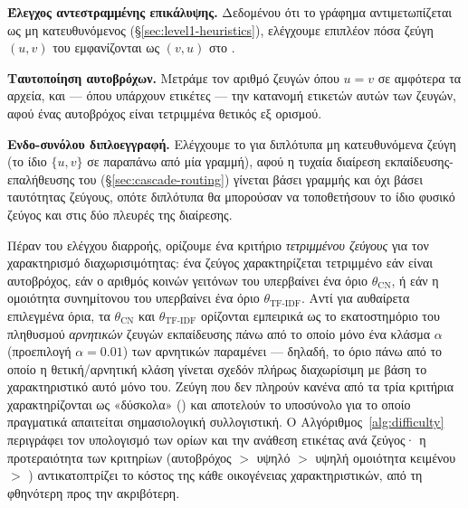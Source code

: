 \textbf{Έλεγχος αντεστραμμένης επικάλυψης.} Δεδομένου ότι το γράφημα αντιμετωπίζεται
ως μη κατευθυνόμενος (\S\ref{sec:level1-heuristics}), ελέγχουμε επιπλέον πόσα ζεύγη
$(u, v)$ του \texttt{} εμφανίζονται ως $(v, u)$ στο
\texttt{}.

\textbf{Ταυτοποίηση αυτοβρόχων.} Μετράμε τον αριθμό ζευγών όπου $u = v$ σε αμφότερα
τα αρχεία, και --- όπου υπάρχουν ετικέτες --- την κατανομή ετικετών αυτών των
ζευγών, αφού ένας αυτοβρόχος είναι τετριμμένα θετικός εξ ορισμού.

\textbf{Ενδο-συνόλου διπλοεγγραφή.} Ελέγχουμε το \texttt{} για
διπλότυπα μη κατευθυνόμενα ζεύγη (το ίδιο $\{u, v\}$ σε παραπάνω από μία γραμμή),
αφού η τυχαία διαίρεση εκπαίδευσης-επαλήθευσης του 
(\S\ref{sec:cascade-routing}) γίνεται βάσει γραμμής και όχι βάσει ταυτότητας
ζεύγους, οπότε διπλότυπα θα μπορούσαν να τοποθετήσουν το ίδιο φυσικό ζεύγος και
στις δύο πλευρές της διαίρεσης.

Πέραν του ελέγχου διαρροής, ορίζουμε ένα κριτήριο \textit{τετριμμένου ζεύγους} για
τον χαρακτηρισμό διαχωρισιμότητας: ένα ζεύγος χαρακτηρίζεται τετριμμένο εάν είναι
αυτοβρόχος, εάν ο αριθμός κοινών γειτόνων του υπερβαίνει ένα όριο $\theta_{\mathrm{CN}}$,
ή εάν η ομοιότητα συνημίτονου  του υπερβαίνει ένα όριο
$\theta_{\mathrm{TF\text{-}IDF}}$.
Αντί για αυθαίρετα επιλεγμένα όρια, τα
$\theta_{\mathrm{CN}}$ και $\theta_{\mathrm{TF\text{-}IDF}}$ ορίζονται εμπειρικά ως
το εκατοστημόριο του πληθυσμού \textit{αρνητικών} ζευγών εκπαίδευσης πάνω από το
οποίο μόνο ένα κλάσμα $\alpha$ (προεπιλογή $\alpha = 0.01$) των αρνητικών παραμένει
— δηλαδή, το όριο πάνω από το οποίο η θετική/αρνητική κλάση γίνεται σχεδόν πλήρως
διαχωρίσιμη με βάση το χαρακτηριστικό αυτό μόνο του.
Ζεύγη που δεν πληρούν κανένα
από τα τρία κριτήρια χαρακτηρίζονται ως «δύσκολα» () και αποτελούν το
υποσύνολο για το οποίο πραγματικά απαιτείται σημασιολογική συλλογιστική.
Ο
Αλγόριθμος~\ref{alg:difficulty} περιγράφει τον υπολογισμό των ορίων και την
ανάθεση ετικέτας ανά ζεύγος· η προτεραιότητα των κριτηρίων (αυτοβρόχος $>$ υψηλό
 $>$ υψηλή ομοιότητα κειμένου $>$ ) αντικατοπτρίζει το κόστος της
κάθε οικογένειας χαρακτηριστικών, από τη φθηνότερη προς την ακριβότερη.

